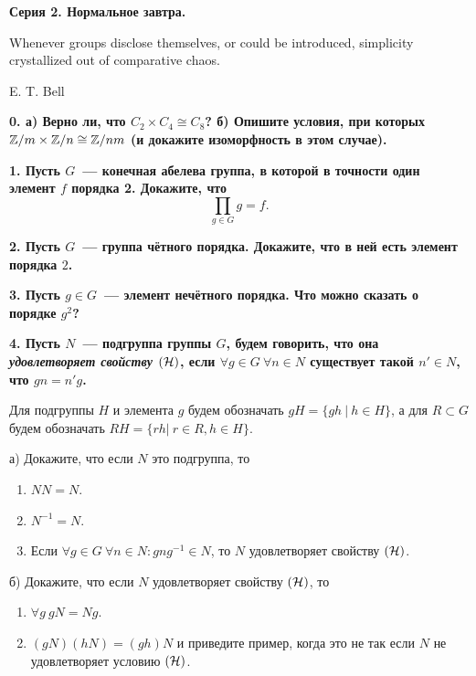 \documentclass[10pt]{article}
\begin{document}
	\begin{landscape}

	\pagestyle{empty}
	\begin{multicols}{2}

	\centerline{\bf{Серия 2. Нормальное завтра. }}

	\epigraph{Whenever groups disclose themselves, or could be introduced, simplicity crystallized out of comparative chaos.}{E. T. Bell}


	\bf{0.} а) Верно ли, что $C_{2} \times C_{4} \cong C_{8}$? б) Опишите условия, при которых  $\mathbb{Z}/m \times \mathbb{Z}/n \cong \mathbb{Z}/nm$ (и докажите изоморфность в этом случае). 


	\bf{1.} Пусть $G$~--- конечная абелева группа, в которой в точности один элемент $f$ порядка 2. Докажите, что 
	\[
		\prod_{g \in G} g = f.
	\]

	\bf{2.} Пусть $G$~--- группа чётного порядка. Докажите, что в ней есть элемент порядка $2$. 

	\bf{3.} Пусть $g \in G$~--- элемент нечётного порядка. Что можно сказать о порядке $g^2$?

	 \bf{4.}  Пусть $N$~--- подгруппа группы $G$, будем говорить, что она \emph{удовлетворяет свойству $(\mathcal{H})$}, если $\forall g \in G \ \forall n \in N$ существует такой $n' \in N$, что $gn = n'g$.

	Для подгруппы $H$ и элемента $g$ будем обозначать $g H = \{ gh \ \vert \ h \in H \}$, а для $R \subset G$ будем обозначать $RH = \{ r h \vert \ r \in R, h \in H \}$.

	а) Докажите, что если $N$ это подгруппа, то
	\vspace{-2mm}
	\begin{enumerate}
		\item $NN = N$. 
		\item $N^{-1} = N$. 
		\item Если $\forall g\in G\  \forall n \in N\colon g n g^{-1} \in N$, то $N$ удовлетворяет свойству $(\mathcal{H})$.
	\end{enumerate}

	б) Докажите, что если $N$ удовлетворяет свойству $(\mathcal{H})$, то
	\vspace{-2mm}
	\begin{enumerate}
		\item $\forall g \ gN = Ng$.
		\item $(gN)(hN) = (gh)N$ и приведите пример, когда это не так если $N$ не удовлетворяет условию $(\mathcal{H})$.
	\end{enumerate}


\end{multicols}
\end{landscape}
\end{document}
